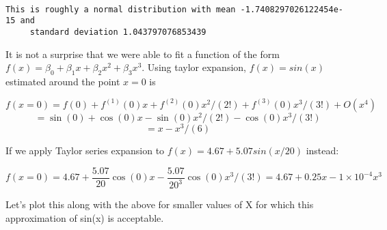 \documentclass[11pt]{article}
\begin{document}
    \begin{center}
    \end{center}
    { \hspace*{\fill} \\}
    
    \begin{Verbatim}[commandchars=\\\{\}]
This is roughly a normal distribution with mean -1.7408297026122454e-15 and
     standard deviation 1.043797076853439

    \end{Verbatim}

    It is not a surprise that we were able to fit a function of the form
\(f(x) = \beta_0 + \beta_1 x + \beta_2 x^2 + \beta_3 x^3\). Using taylor
expansion, \(f(x) = sin(x)\) estimated around the point \(x=0\) is

\[f(x=0) = f(0) + f^{(1)}(0)x + f^{(2)}(0)x^2/(2!) + f^{(3)}(0)x^3/(3!) + O(x^4)\]
\[= \sin(0) + \cos(0)x - \sin(0)x^2/(2!) -\cos(0)x^3/(3!)\]
\[= x - x^3/(6)\]

If we apply Taylor series expansion to \(f(x) = 4.67 + 5.07 sin(x/20)\)
instead:

\[f(x=0) = 4.67 + \frac{5.07}{20}\cos(0)x-\frac{5.07}{20^3}\cos(0)x^3/(3!)=4.67 + 0.25x - 1 \times 10^{-4} x^3\]

Let's plot this along with the above for smaller values of X for which
this approximation of sin(x) is acceptable.
\end{document}
